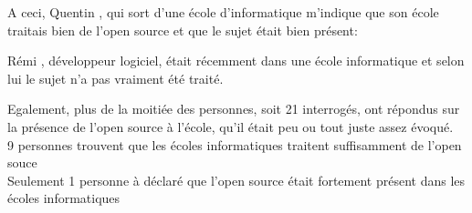 				A ceci, Quentin , qui sort d'une école d'informatique m'indique que son école traitais bien de l'open source et que le sujet était bien présent:

				\begin{center}
					\textit{
					}
				\end{center}

				Rémi , développeur logiciel, était récemment dans une école informatique et selon lui le sujet n'a pas vraiment été traité.

				\begin{center}
					\textit{
					}
				\end{center}

				Egalement, plus de la moitiée des personnes, soit 21 interrogés, ont répondus sur la présence de l'open source à l'école, qu'il était peu ou tout juste assez évoqué.\\

				9 personnes trouvent que les écoles informatiques traitent suffisamment de l'open souce\\

				Seulement 1 personne à déclaré que l'open source était fortement présent dans les écoles informatiques

